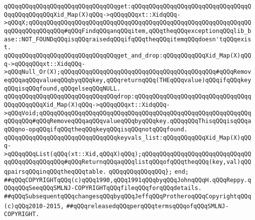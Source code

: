 \verb|qQQqqQQqqQQqqQQqqQQqqQQqqQQqqQQqget:qQQqqQQqqQQqqQQqqQQqqQQqqQQqqQQqqQQqqQQqqQQqqQQqXid_Map(X)qQQq->qQQqqQQqxt::XidqQQq->qQQqX;qQQqqQQqqQQqqQQqqQQqqQQqqQQqqQQqqQQqqQQqqQQqqQQqqQQqqQQqqQQqqQQqqQQqqQQqqQQqqQQq#qQQqFindqQQqanqQQqitem,qQQqtheqQQqexceptionqQQqlib_base::NOT_FOUNDqQQqisqQQqraisedqQQqifqQQqtheqQQqitemqQQqdoesn'tqQQqexist.|\newline
\newline
\verb|qQQqqQQqqQQqqQQqqQQqqQQqqQQqqQQqget_and_drop:qQQqqQQqqQQqXid_Map(X)qQQq->qQQqqQQqxt::XidqQQq->qQQqNull_Or(X);qQQqqQQqqQQqqQQqqQQqqQQqqQQqqQQqqQQqqQQqqQQq#qQQqRemoveqQQqaqQQqvalueqQQqbyqQQqkey,qQQqreturnqQQq(THEqQQqvalue)qQQqifqQQqkeyqQQqisqQQqfound,qQQqelseqQQqNULL.|\newline
\verb|qQQqqQQqqQQqqQQqqQQqqQQqqQQqqQQqdrop:qQQqqQQqqQQqqQQqqQQqqQQqqQQqqQQqqQQqqQQqqQQqXid_Map(X)qQQq->qQQqqQQqxt::XidqQQq->qQQqVoid;qQQqqQQqqQQqqQQqqQQqqQQqqQQqqQQqqQQqqQQqqQQqqQQqqQQqqQQqqQQqqQQqqQQq#qQQqRemoveqQQqaqQQqvalueqQQqbyqQQqkey.qQQqqQQqThisqQQqisqQQqaqQQqno-opqQQqifqQQqtheqQQqkeyqQQqisqQQqnotqQQqfound.|\newline
\verb|qQQqqQQqqQQqqQQqqQQqqQQqqQQqqQQqkeyvals_list:qQQqqQQqqQQqXid_Map(X)qQQq->qQQqqQQqList(qQQq(xt::Xid,qQQqX)qQQq);qQQqqQQqqQQqqQQqqQQqqQQqqQQqqQQqqQQqqQQqqQQqqQQq#qQQqReturnqQQqaqQQqlistqQQqofqQQqtheqQQq(key,val)qQQqpairsqQQqinqQQqtheqQQqtable.|\newline
\verb|qQQqqQQqqQQqqQQq};|\newline
\newline
\verb|end;|\newline
\newline
\newline
\verb|##qQQqCOPYRIGHTqQQq(c)qQQq1990,qQQq1991qQQqbyqQQqJohnqQQqH.qQQqReppy.qQQqqQQqSeeqQQqSMLNJ-COPYRIGHTqQQqfileqQQqforqQQqdetails.|\newline
\verb|##qQQqSubsequentqQQqchangesqQQqbyqQQqJeffqQQqProtheroqQQqCopyrightqQQq(c)qQQq2010-2015,|\newline
\verb|##qQQqreleasedqQQqperqQQqtermsqQQqofqQQqSMLNJ-COPYRIGHT.|\newline


